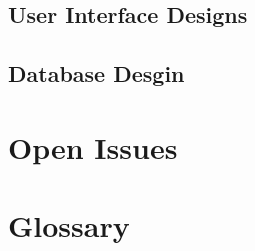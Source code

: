 \documentclass[12pt]{article}
\begin{document}
		\subsection{User Interface Designs}
				\vspace{0.2in}
		
		\subsection{Database Desgin}
						
				\vspace{0.2in}
			
			
	
	\section{Open Issues}
	
		\vspace{0.2in}
		
		
	\newpage
	\section{Glossary}
	
		\vspace{0.2in}
		
			
	
	
\end{document}
